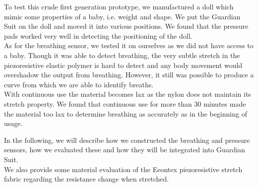 \documentclass{sigchi-ext}
\begin{document}
To test this crude first generation prototype, we manufactured a doll which 
mimic some properties of a baby, i.e. weight and shape. We put the Guardian Suit
on the doll and moved it into various positions. We found that the pressure pads
worked very well in detecting the positioning of the doll.\\
As for the breathing
sensor, we tested it on ourselves as we did not have access to a baby. Though
it was able to detect breathing, the very subtle stretch in the piezoresistive
elastic polymer is hard to detect and any body movement would overshadow the output
from breathing. However, it still was possible to produce a curve from which 
we are able to identify breaths.\\
With continuous use the material becomes lax as the nylon does not maintain its stretch
property. We found that continuous use for more than 30 minutes made the material
too lax to determine breathing as accurately as in the beginning of usage.

In the following, we will describe how we constructed
the breathing and pressure sensors, how we evaluated
these and how they will be integrated into Guardian Suit.\\
We also provide some material evaluation of the Eeontex
piezoresistive stretch fabric regarding the resistance
change when stretched.

\end{document}

